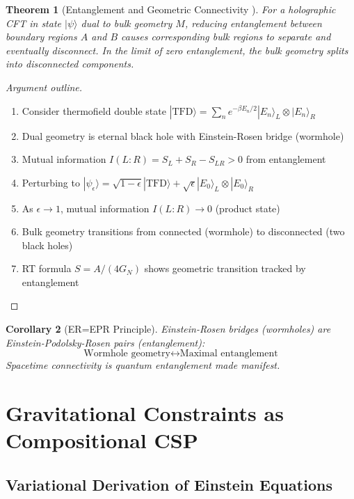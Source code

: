 \documentclass[11pt,a4paper]{article}
\newtheorem{theorem}{Theorem}[section]
\newtheorem{corollary}[theorem]{Corollary}
\theoremstyle{remark}
\theoremstyle{definition}
\begin{document}
\begin{theorem}[Entanglement and Geometric Connectivity \cite{VanRaamsdonk2010}]
\label{thm:van_raamsdonk}
For a holographic CFT in state $|\psi\rangle$ dual to bulk geometry $M$, reducing entanglement between boundary regions $A$ and $B$ causes corresponding bulk regions to separate and eventually disconnect. In the limit of zero entanglement, the bulk geometry splits into disconnected components.
\end{theorem}

\begin{proof}[Argument outline]
\begin{enumerate}
\item Consider thermofield double state $|\text{TFD}\rangle = \sum_n e^{-\beta E_n/2} |E_n\rangle_L \otimes |E_n\rangle_R$
\item Dual geometry is eternal black hole with Einstein-Rosen bridge (wormhole)
\item Mutual information $I(L:R) = S_L + S_R - S_{LR} > 0$ from entanglement
\item Perturbing to $|\psi_\epsilon\rangle = \sqrt{1-\epsilon}|\text{TFD}\rangle + \sqrt{\epsilon}|E_0\rangle_L \otimes |E_0\rangle_R$
\item As $\epsilon \to 1$, mutual information $I(L:R) \to 0$ (product state)
\item Bulk geometry transitions from connected (wormhole) to disconnected (two black holes)
\item RT formula $S = A/(4G_N)$ shows geometric transition tracked by entanglement
\end{enumerate}
\end{proof}

\begin{corollary}[ER=EPR Principle]
Einstein-Rosen bridges (wormholes) are Einstein-Podolsky-Rosen pairs (entanglement):
\begin{equation}
\text{Wormhole geometry} \leftrightarrow \text{Maximal entanglement}
\end{equation}
Spacetime connectivity is quantum entanglement made manifest.
\end{corollary}

\section{Gravitational Constraints as Compositional CSP}
\label{sec:constraint_formulation}

\subsection{Variational Derivation of Einstein Equations}
\end{document}
